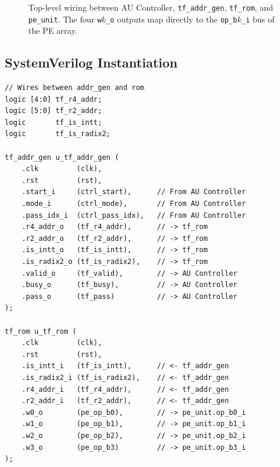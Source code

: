 \documentclass[11pt,a4paper]{article}
\newcommand{\sv}[1]{\texttt{#1}}
\newcommand{\port}[1]{\texttt{#1}}
\begin{document}
\begin{figure}[H]
\caption{Top-level wiring between AU Controller, \sv{tf\_addr\_gen}, \sv{tf\_rom},
  and \sv{pe\_unit}. The four \port{w$k$\_o} outputs map directly to the
  \port{op\_b$k$\_i} bus of the PE array.}
\label{fig:top-level}
\end{figure}

\subsection{SystemVerilog Instantiation}

\begin{lstlisting}
// Wires between addr_gen and rom
logic [4:0] tf_r4_addr;
logic [5:0] tf_r2_addr;
logic       tf_is_intt;
logic       tf_is_radix2;

tf_addr_gen u_tf_addr_gen (
    .clk         (clk),
    .rst         (rst),
    .start_i     (ctrl_start),      // From AU Controller
    .mode_i      (ctrl_mode),       // From AU Controller
    .pass_idx_i  (ctrl_pass_idx),   // From AU Controller
    .r4_addr_o   (tf_r4_addr),      // -> tf_rom
    .r2_addr_o   (tf_r2_addr),      // -> tf_rom
    .is_intt_o   (tf_is_intt),      // -> tf_rom
    .is_radix2_o (tf_is_radix2),    // -> tf_rom
    .valid_o     (tf_valid),        // -> AU Controller
    .busy_o      (tf_busy),         // -> AU Controller
    .pass_o      (tf_pass)          // -> AU Controller
);

tf_rom u_tf_rom (
    .clk         (clk),
    .rst         (rst),
    .is_intt_i   (tf_is_intt),      // <- tf_addr_gen
    .is_radix2_i (tf_is_radix2),    // <- tf_addr_gen
    .r4_addr_i   (tf_r4_addr),      // <- tf_addr_gen
    .r2_addr_i   (tf_r2_addr),      // <- tf_addr_gen
    .w0_o        (pe_op_b0),        // -> pe_unit.op_b0_i
    .w1_o        (pe_op_b1),        // -> pe_unit.op_b1_i
    .w2_o        (pe_op_b2),        // -> pe_unit.op_b2_i
    .w3_o        (pe_op_b3)         // -> pe_unit.op_b3_i
);
\end{lstlisting}
\end{document}
